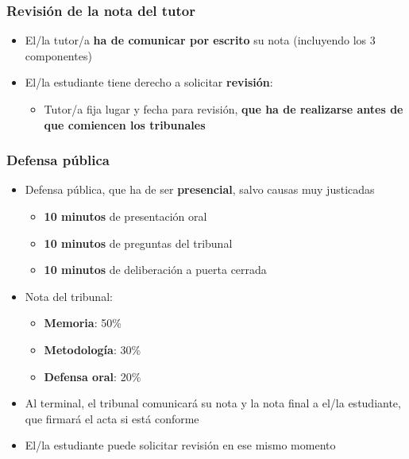 \documentclass[utf8, xcolor=dvipsnames]{beamer}
\begin{document}
\begin{frame}
\frametitle{Revisión de la nota del tutor}
\centering

\begin{itemize}
  \item El/la tutor/a \textbf{ha de comunicar por escrito} su nota (incluyendo los 3 componentes)
  \item El/la estudiante tiene derecho a solicitar \textbf{revisión}:
  \begin{itemize}
    \item Tutor/a fija lugar y fecha para revisión, \textbf{que ha de realizarse antes de que comiencen los tribunales}
  \end{itemize}
\end{itemize}

\end{frame}

\begin{frame}
\frametitle{Defensa pública}
\centering

\begin{itemize}
  \item Defensa pública, que ha de ser \textbf{presencial}, salvo causas muy justicadas
  \begin{itemize}
    \item \textbf{10 minutos} de presentación oral
    \item \textbf{10 minutos} de preguntas del tribunal
    \item \textbf{10 minutos} de deliberación a puerta cerrada
  \end{itemize}
  \item Nota del tribunal:
  \begin{itemize}
    \item \textbf{Memoria}: 50\%
    \item \textbf{Metodología}: 30\%
    \item \textbf{Defensa oral}: 20\%
  \end{itemize}
  \item Al terminal, el tribunal comunicará su nota y la nota final a el/la estudiante, que firmará el acta si está conforme
  \item El/la estudiante puede solicitar revisión en ese mismo momento
\end{itemize}

\end{frame}
\end{document}
